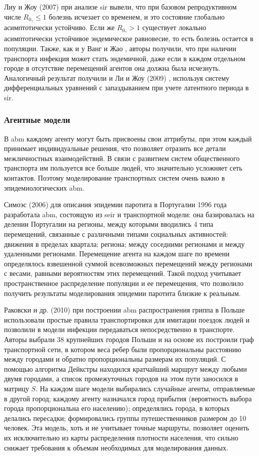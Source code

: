 \documentclass[a4paper,12pt]{article} %
\begin{document}
Лиу и Жоу (2007) \cite{liu2009global} при анализе \gls{sir} вывели, что при базовом репродуктивном числе $R_{0_\gamma} \leqslant 1$ болезнь исчезает со временем, и это состояние глобально асимптотически устойчиво. Если же $R_{0_\gamma} > 1$ существует локально асимптотически устойчивое эндемическое равновесие, то есть болезнь остается в популяции. Также, как и у Ванг и Жао \cite{wang2004epidemic}, авторы получили, что при наличии транспорта инфекция может стать эндемичной, даже если в каждом отдельном городе в отсутствие перемещений агентов она должна была исчезнуть. Аналогичный результат получили и Ли и Жоу (2009) \cite{li2010dynamics}, используя систему дифференциальных уравнений с запаздыванием при учете латентного периода в \gls{sir}.

\subsubsection{Агентные модели}
В \gls{abm} каждому агенту могут быть присвоены свои аттрибуты, при этом каждый принимает индивидуальные решения, что позволяет отразить все детали межличностных взаимодействий. В связи с развитием систем общественного транспорта им пользуется все больше людей, что значительно усложняет сеть контактов. Поэтому моделирование транспортных систем очень важно в эпидемиологических \gls{abm}.

Симоэс (2006) \cite{simoes2006modelling} для описания эпидемии паротита в Португалии 1996 года разработала \gls{abm}, состоящую из \gls{seir} и транспортной модели: она базировалась на делении Португалии на регионы, между которыми вводились 4 типа перемещений, связанные с различными типами социальных активностей: движения в пределах квартала; региона; между соседними регионами и между удаленными регионами. Перемещение агента на каждом шаге по времени определялось взвешенной суммой всевозможных перемещений между регионами с весами, равными вероятностям этих перемещений. Такой подход учитывает пространственное распределение популяции и ее перемещения, что позволило получить результаты моделирования эпидемии паротита близкие к реальным.

Раковски и др. (2010) \cite{rakowski2010influenza} при построении \gls{abm} распространения гриппа в Польше использовали простые правила транспортировки для имитации поездок людей и позволили в модели инфекции передаваться непосредственно в транспорте. Авторы выбрали 38 крупнейших городов Польши и на основе их построили граф транспортной сети, в котором веса ребер были пропорциональны расстоянию между городами и обратно пропорциональны размерам их популяций. С помощью алгоритма Дейкстры находился кратчайший маршрут между любыми двумя городами, а список промежуточных городов на этом пути заносился в матрицу $S$. На каждом шаге модели выбирались случайные агенты, отправляемые в другой город; каждому агенту назначался город прибытия (вероятность выбора города пропорциональна его населению); определялись города, в которых делались пересадки; формировались группы путешественников размером до 10 человек. Эта модель, хоть и не учитывает точные маршруты, позволяет оценить их исключительно из карты распределения плотности населения, что сильно снижает требования к объемам необходимых для моделирования данных.
\end{document}
